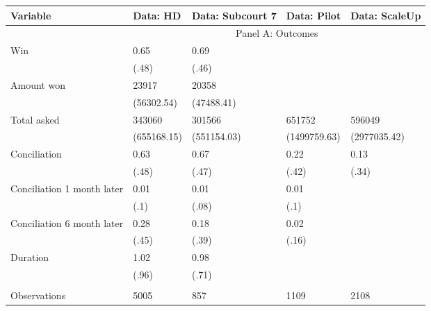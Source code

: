 \begin{tabular}{lllll}
\toprule
Variable & Data: HD & Data: Subcourt 7 & Data: Pilot & Data: ScaleUp \\
\midrule
\midrule
      & \multicolumn{4}{c}{Panel A: Outcomes} \\
\cmidrule{2-5}Win   & 0.65  & 0.69  &       &  \\
      & (.48) & (.46) &       &  \\
Amount won & 23917 & 20358 &       &  \\
      & (56302.54) & (47488.41) &       &  \\
Total asked & 343060 & 301566 & 651752 & 596049 \\
      & (655168.15) & (551154.03) & (1499759.63) & (2977035.42) \\
Conciliation  & 0.63  & 0.67  & 0.22  & 0.13 \\
      & (.48) & (.47) & (.42) & (.34) \\
Conciliation 1 month later & 0.01  & 0.01  & 0.01  &  \\
      & (.1)  & (.08) & (.1)  &  \\
Conciliation 6 month later & 0.28  & 0.18  & 0.02  &  \\
      & (.45) & (.39) & (.16) &  \\
Duration & 1.02  & 0.98  &       &  \\
      & (.96) & (.71) &       &  \\
\midrule
\midrule
      &       &       &       &  \\
Observations & 5005  & 857   & 1109  & 2108 \\
\bottomrule
\end{tabular}%
